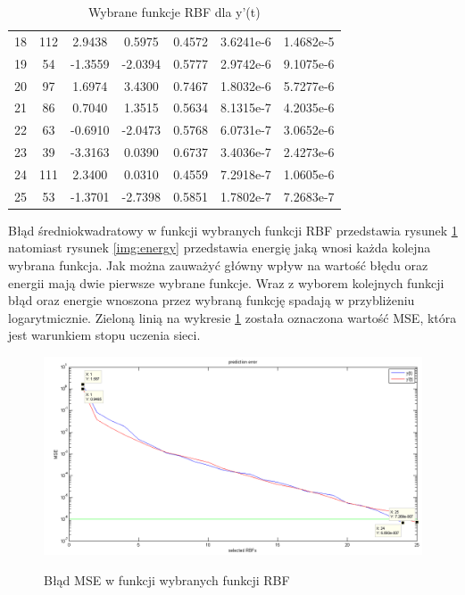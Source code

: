 \begin{table}[ht!]
\begin{tabular}{ |c| c| c| c| c| c| c| }
   18 & 112 &   2.9438 &   0.5975  &  0.4572 &   3.6241e-6 & 1.4682e-5 \\
   19 &  54 &  -1.3559 &  -2.0394  &  0.5777 &   2.9742e-6 & 9.1075e-6 \\
   20 &  97 &   1.6974 &   3.4300  &  0.7467 &   1.8032e-6 & 5.7277e-6 \\
   21 &  86 &   0.7040 &   1.3515  &  0.5634 &   8.1315e-7 & 4.2035e-6 \\
   22 &  63 &  -0.6910 &  -2.0473  &  0.5768 &   6.0731e-7 & 3.0652e-6 \\
   23 &  39 &  -3.3163 &   0.0390  &  0.6737 &   3.4036e-7 & 2.4273e-6 \\
   24 & 111 &   2.3400 &   0.0310  &  0.4559 &   7.2918e-7 & 1.0605e-6 \\
   25 &  53 &  -1.3701 &  -2.7398  &  0.5851 &   1.7802e-7 & 7.2683e-7 \\
    \hline
\end{tabular}

\caption{Wybrane funkcje RBF dla y'(t)}
\label{tab:rbf_tabela_x2}
\end{table}

\clearpage

Błąd średniokwadratowy w funkcji wybranych funkcji RBF przedstawia rysunek \ref{img:prediction_error} natomiast rysunek \ref{img:energy} przedstawia energię jaką wnosi każda kolejna wybrana funkcja. Jak można zauważyć główny wpływ na wartość błędu oraz energii mają dwie pierwsze wybrane funkcje. Wraz z wyborem kolejnych funkcji błąd oraz energie wnoszona przez wybraną funkcję spadają w przybliżeniu logarytmicznie. Zieloną linią na wykresie \ref{img:prediction_error} została oznaczona wartość MSE, która jest warunkiem stopu uczenia sieci.

\begin{figure}[ht!]
	\centering

	{\includegraphics[width=\textwidth]
	{images/prediction_error.png}}

	\caption{Błąd MSE w funkcji wybranych funkcji RBF}
	\label{img:prediction_error}
\end{figure}


